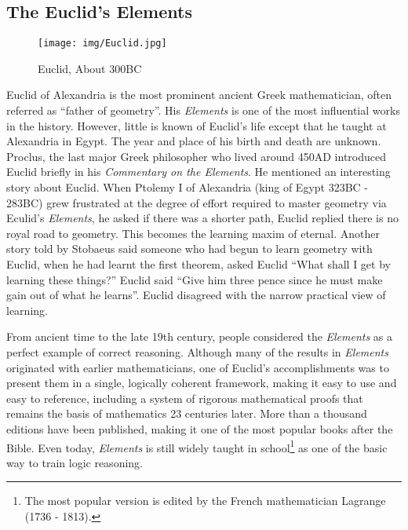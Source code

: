 \documentclass{article}
\begin{document}
\subsection{The Euclid's Elements}

\begin{wrapfigure}{R}{0.35\textwidth}
 \centering
 \texttt{[image: img/Euclid.jpg]}
 \captionsetup{labelformat=empty}
 \caption{Euclid, About 300BC}
 \label{fig:Euclid}
\end{wrapfigure}

Euclid of Alexandria is the most prominent ancient Greek mathematician, often referred as ``father of geometry''. His {\em Elements} is one of the most influential works in the history. However, little is known of Euclid's life except that he taught at Alexandria in Egypt. The year and place of his birth and death are unknown. Proclus, the last major Greek philosopher who lived around 450AD introduced Euclid briefly in his {\em Commentary on the Elements}. He mentioned an interesting story about Euclid. When Ptolemy I of Alexandria (king of Egypt 323BC - 283BC) grew frustrated at the degree of effort required to master geometry via Eculid's {\em Elements}, he asked if there was a shorter path, Euclid replied there is no royal road to geometry. This becomes the learning maxim of eternal. Another story told by Stobaeus said someone who had begun to learn geometry with Euclid, when he had learnt the first theorem, asked Euclid ``What shall I get by learning these things?'' Euclid said ``Give him three pence since he must make gain out of what he learns''. Euclid disagreed with the narrow practical view of learning\cite{Elements}.

From ancient time to the late 19th century, people considered the {\em Elements} as a perfect example of correct reasoning. Although many of the results in {\em Elements} originated with earlier mathematicians, one of Euclid's accomplishments was to present them in a single, logically coherent framework, making it easy to use and easy to reference, including a system of rigorous mathematical proofs that remains the basis of mathematics 23 centuries later. More than a thousand editions have been published, making it one of the most popular books after the Bible. Even today, {\em Elements} is still widely taught in school\footnote{The most popular version is edited by the French mathematician Lagrange (1736 - 1813).} as one of the basic way to train logic reasoning\cite{HanXueTao16}.
\end{document}
